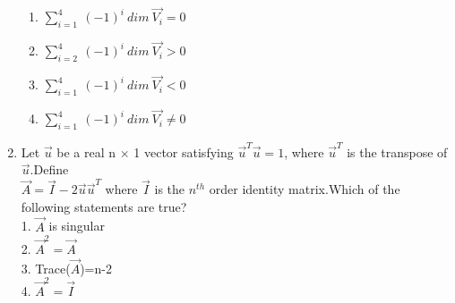 \begin{enumerate}[label=\thesection.\arabic*.,ref=\thesection.\theenumi]
	\begin{enumerate}
		\item $\sum_{i=1}^{4} \ (-1)^{i} \ dim \ \vec{V_i} = 0$ \\
		\item $\sum_{i=2}^{4} \ (-1)^{i} \ dim \ \vec{V_i} > 0$ \\
		\item $\sum_{i=1}^{4} \ (-1)^{i} \ dim \ \vec{V_i} < 0$ \\
		\item $\sum_{i=1}^{4} \ (-1)^{i} \ dim \ \vec{V_i} \neq 0$
	\end{enumerate}
%
\solution

\item Let $\vec{u}$ be a real n $\times$ 1 vector satisfying $\vec{u}^T\vec{u}=1$, where $\vec{u}^T$ is the transpose of $\vec{u}$.Define\\
$\vec{A}=\vec{I}-2\vec{u}\vec{u}^T$ where $\vec{I}$ is the $n^{th}$ order identity matrix.Which of the following statements are true?\\
1. $\vec{A}$ is singular\\
2. $\vec{A}^2=\vec{A}$\\
3. Trace($\vec{A}$)=n-2\\
4. $\vec{A}^2=\vec{I}$\\
%
\solution


\end{enumerate}
